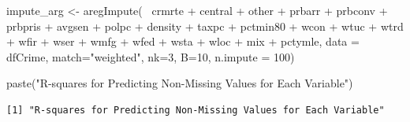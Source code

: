\documentclass[]{article}
\newenvironment{Shaded}{}{}
\newcommand{\DataTypeTok}[1]{#1}
\newcommand{\DecValTok}[1]{#1}
\newcommand{\KeywordTok}[1]{\textcolor[rgb]{0.00,0.00,1.00}{#1}}
\newcommand{\NormalTok}[1]{#1}
\newcommand{\OperatorTok}[1]{#1}
\newcommand{\StringTok}[1]{\textcolor[rgb]{0.00,0.50,0.50}{#1}}
\begin{document}
\begin{Shaded}
\begin{Highlighting}[]
\NormalTok{impute_arg <-}\StringTok{ }\KeywordTok{aregImpute}\NormalTok{(}\OperatorTok{~}\StringTok{ }\NormalTok{crmrte }\OperatorTok{+}\StringTok{ }\NormalTok{central }\OperatorTok{+}\StringTok{ }\NormalTok{other }\OperatorTok{+}
\StringTok{                         }\NormalTok{prbarr }\OperatorTok{+}\StringTok{ }\NormalTok{prbconv }\OperatorTok{+}\StringTok{ }\NormalTok{prbpris }\OperatorTok{+}\StringTok{ }\NormalTok{avgsen }\OperatorTok{+}\StringTok{ }\NormalTok{polpc }\OperatorTok{+}\StringTok{ }
\StringTok{                         }\NormalTok{density }\OperatorTok{+}\StringTok{ }\NormalTok{taxpc }\OperatorTok{+}\StringTok{ }\NormalTok{pctmin80 }\OperatorTok{+}\StringTok{ }\NormalTok{wcon }\OperatorTok{+}\StringTok{ }\NormalTok{wtuc }\OperatorTok{+}
\StringTok{                         }\NormalTok{wtrd }\OperatorTok{+}\StringTok{ }\NormalTok{wfir }\OperatorTok{+}\StringTok{ }\NormalTok{wser }\OperatorTok{+}\StringTok{ }\NormalTok{wmfg }\OperatorTok{+}\StringTok{ }\NormalTok{wfed }\OperatorTok{+}\StringTok{ }\NormalTok{wsta }\OperatorTok{+}\StringTok{ }\NormalTok{wloc }\OperatorTok{+}
\StringTok{                         }\NormalTok{mix }\OperatorTok{+}\StringTok{ }\NormalTok{pctymle, }\DataTypeTok{data =}\NormalTok{ dfCrime, }\DataTypeTok{match=}\StringTok{"weighted"}\NormalTok{,}
                         \DataTypeTok{nk=}\DecValTok{3}\NormalTok{, }\DataTypeTok{B=}\DecValTok{10}\NormalTok{, }\DataTypeTok{n.impute =} \DecValTok{100}\NormalTok{)}
\end{Highlighting}
\end{Shaded}

\begin{Shaded}
\begin{Highlighting}[]
\KeywordTok{paste}\NormalTok{(}\StringTok{"R-squares for Predicting Non-Missing Values for Each Variable"}\NormalTok{)}
\end{Highlighting}
\end{Shaded}

\begin{verbatim}
[1] "R-squares for Predicting Non-Missing Values for Each Variable"
\end{verbatim}

\begin{Shaded}
\end{Shaded}
\end{document}
